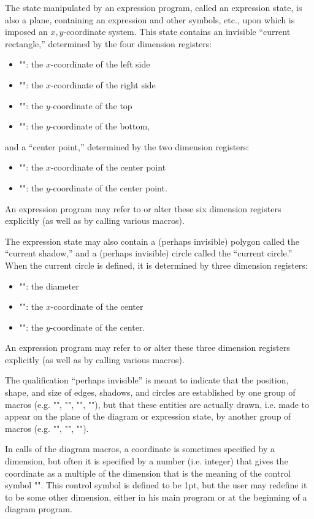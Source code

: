 \documentclass[11pt]{article}
\begin{document}
The state manipulated by an expression program, called an expression state,
is also a plane, containing an expression and other symbols, etc.,
upon which is imposed an $x,y$-coordinate system.  This state contains an
invisible ``current rectangle,'' determined by the four dimension registers:
\begin{itemize}
\item     "\lexpr": the $x$-coordinate of the left side
\item     "\rexpr": the $x$-coordinate of the right side
\item     "\texpr": the $y$-coordinate of the top
\item     "\bexpr": the $y$-coordinate of the bottom,
\end{itemize}
and a ``center point,'' determined by the two dimension registers:
\begin{itemize}
\item     "\xcenter": the $x$-coordinate of the center point
\item     "\ycenter": the $y$-coordinate of the center point.
\end{itemize}
An expression program may refer to or alter these six dimension registers
explicitly (as well as by calling various macros).

The expression state may also contain a (perhaps invisible) polygon called
the ``current shadow,'' and a (perhaps invisible) circle called the
``current circle.''  When the current circle is defined, it is determined
by three dimension registers:
\begin{itemize}
\item     "\dcircle": the diameter
\item     "\xcircle": the $x$-coordinate of the center
\item     "\ycircle": the $y$-coordinate of the center.
\end{itemize}
An expression program may refer to or alter these three dimension registers
explicitly (as well as by calling various macros).

The qualification ``perhaps invisible'' is meant to indicate that the 
position, shape, and size of edges, shadows, and circles are established
by one group of macros (e.g. "\setedge", "\rect", "\octagon", "\setcircle"), but
that these entities are actually drawn, i.e. made to appear on the plane
of the diagram or expression state, by another group of macros (e.g.
"\drawsolidedge", "\outline", "\drawcircle").

In calls of the diagram macros, a coordinate is sometimes specified by a
dimension, but often it is specified by a number (i.e. integer) that gives
the coordinate as a multiple of the dimension that is the meaning of the
control symbol "\diagramunit".  This control symbol is defined to be 1pt,
but the user may redefine it to be some other dimension, either in his main
program or at the beginning of a diagram program.
\end{document}
